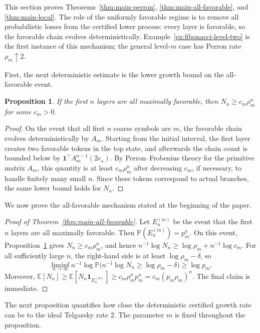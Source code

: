 \documentclass[11pt]{amsart}
\numberwithin{equation}{section}
\theoremstyle{plain}
\newtheorem{proposition}[theorem]{Proposition}
\theoremstyle{definition}
\theoremstyle{remark}
\begin{document}
This section proves Theorems~\ref{thm:main-perron}, \ref{thm:main-all-favorable}, and \ref{thm:main-local}. The role of the uniformly favorable regime is to remove all probabilistic losses from the certified lower process: every layer is favorable, so the favorable chain evolves deterministically. Example~\ref{ex:fibonacci-level-two} is the first instance of this mechanism; the general level-\(m\) case has Perron rate \(\rho_m\uparrow2\).


First, the next deterministic estimate is the lower growth bound on the all-favorable event.

\begin{proposition}\label{prop:all-favorable-growth}
If the first \(n\) layers are all maximally favorable, then
\(
N_n\ge c_m\rho_m^n
\)
for some \(c_m>0\).
\end{proposition}

\begin{proof}
On the event that all first \(n\) coarse symbols are \(m\), the favorable chain evolves deterministically by \(A_m\). Starting from the initial interval, the first layer creates two favorable tokens in the top state, and afterwards the chain count is bounded below by \(\mathbf 1^\top A_m^{n-1}(2e_\star)\). By Perron--Frobenius theory for the primitive matrix \(A_m\), this quantity is at least \(c_m\rho_m^n\) after decreasing \(c_m\), if necessary, to handle finitely many small \(n\). Since these tokens correspond to actual branches, the same lower bound holds for \(N_n\).
\end{proof}

We now prove the all-favorable mechanism stated at the beginning of the paper.

\begin{proof}[Proof of Theorem~\ref{thm:main-all-favorable}]
Let \(E_n^{(m)}\) be the event that the first \(n\) layers are all maximally favorable. Then \(\mathbb P(E_n^{(m)})=p_m^n\). On this event, Proposition~\ref{prop:all-favorable-growth} gives \(N_n\ge c_m\rho_m^n\), and hence \(n^{-1}\log N_n\ge\log\rho_m+n^{-1}\log c_m\). For all sufficiently large \(n\), the right-hand side is at least \(\log\rho_m-\delta\), so
\[
\liminf_{n\to\infty} n^{-1}
\log\mathbb P\bigl(n^{-1}\log N_n\ge\log\rho_m-\delta\bigr)
\ge \log p_m.
\]
Moreover,
\(
\mathbb E[N_n]
\ge \mathbb E[N_n\mathbf 1_{E_n^{(m)}}]
\ge c_m\rho_m^n p_m^n
=c_m(p_m\rho_m)^n.
\)
The final claim is immediate.
\end{proof}

The next proposition quantifies how close the deterministic certified growth rate can be to the ideal Telgarsky rate \(2\). The parameter \(m\) is fixed throughout the proposition.
\end{document}
